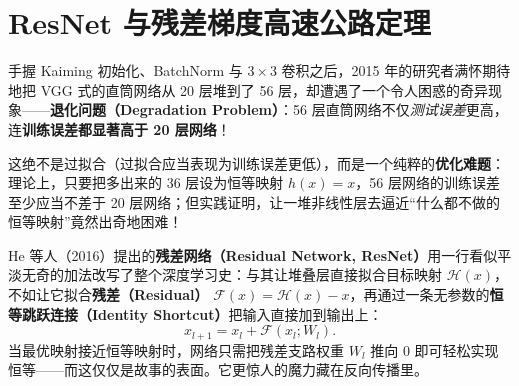 \section{ResNet 与残差梯度高速公路定理}
\label{sec:resnet}

手握 Kaiming 初始化、BatchNorm 与 $3\times 3$ 卷积之后，2015 年的研究者满怀期待地把 VGG 式的直筒网络从 20 层堆到了 56 层，却遭遇了一个令人困惑的奇异现象——\textbf{退化问题（Degradation Problem）}：56 层直筒网络不仅\emph{测试误差}更高，连\textbf{训练误差都显著高于 20 层网络}！

这绝不是过拟合（过拟合应当表现为训练误差更低），而是一个纯粹的\textbf{优化难题}：理论上，只要把多出来的 36 层设为恒等映射 $h(x) = x$，56 层网络的训练误差至少应当不差于 20 层网络；但实践证明，让一堆非线性层去逼近“什么都不做的恒等映射”竟然出奇地困难！

He 等人（2016）提出的\textbf{残差网络（Residual Network, ResNet）}用一行看似平淡无奇的加法改写了整个深度学习史：与其让堆叠层直接拟合目标映射 $\mathcal{H}(x)$，不如让它拟合\textbf{残差（Residual）} $\mathcal{F}(x) = \mathcal{H}(x) - x$，再通过一条无参数的\textbf{恒等跳跃连接（Identity Shortcut）}把输入直接加到输出上：
\[
  x_{l+1} = x_l + \mathcal{F}(x_l; W_l).
\]
当最优映射接近恒等映射时，网络只需把残差支路权重 $W_l$ 推向 $0$ 即可轻松实现恒等——而这仅仅是故事的表面。它更惊人的魔力藏在反向传播里。

